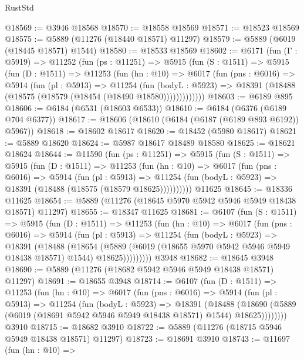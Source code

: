 \begin{lexlean}{RustStd}
\begin{coremodule}
@18569 := @3946 @18568
@18570 := @18558 @18569
@18571 := @18523 @18569
@18575 := @5889 (@11276 (@18440 @18571) @11297)
@18579 := @5889 (@6019 (@18445 @18571) @1544)
@18580 := @18533 @18569
@18602 := @6171
    (fun (Γ : @5919) =>
    @11252
      (fun (ps : @11251) =>
      @5915
        (fun (S : @1511) =>
        @5915
          (fun (D : @1511) =>
          @11253
            (fun (hn : @10) =>
            @6017
              (fun (pns : @6016) =>
              @5914
                (fun (pl : @5913) =>
                @11254
                  (fun (bodyL : @5923) =>
                  @18391 (@18488 (@18575 (@18579 (@18454 (@18490 @18580)))))))))))))
@18603 := @6189 @895
@18606 := @6184 (@6531 (@18603 @6533))
@18610 := @6184 (@6376 (@6189 @704 @6377))
@18617 := @18606 (@18610 (@6184 (@6187 (@6189 @893 @6192)) @5967))
@18618 := @18602 @18617
@18620 := @18452 (@5980 @18617)
@18621 := @5889 @18620
@18624 := @5987 @18617 @18489 @18580
@18625 := @18621 @18624
@18644 := @11590
    (fun (ps : @11251) =>
    @5915
      (fun (S : @1511) =>
      @5915
        (fun (D : @1511) =>
        @11253
          (fun (hn : @10) =>
          @6017
            (fun (pns : @6016) =>
            @5914
              (fun (pl : @5913) =>
              @11254 (fun (bodyL : @5923) => @18391 (@18488 (@18575 (@18579 @18625))))))))))
    @11625
@18645 := @18336 @11625
@18654 := @5889 (@11276 (@18645 @5970 @5942 @5946 @5949 @18438 @18571) @11297)
@18655 := @18347 @11625
@18681 := @6107
    (fun (S : @1511) =>
    @5915
      (fun (D : @1511) =>
      @11253
        (fun (hn : @10) =>
        @6017
          (fun (pns : @6016) =>
          @5914
            (fun (pl : @5913) =>
            @11254
              (fun (bodyL : @5923) =>
              @18391
                (@18488
                  (@18654
                    (@5889
                      (@6019 (@18655 @5970 @5942 @5946 @5949 @18438 @18571) @1544)
                      @18625)))))))))
    @3948
@18682 := @18645 @3948
@18690 := @5889 (@11276 (@18682 @5942 @5946 @5949 @18438 @18571) @11297)
@18691 := @18655 @3948
@18714 := @6107
    (fun (D : @1511) =>
    @11253
      (fun (hn : @10) =>
      @6017
        (fun (pns : @6016) =>
        @5914
          (fun (pl : @5913) =>
          @11254
            (fun (bodyL : @5923) =>
            @18391
              (@18488
                (@18690 (@5889 (@6019 (@18691 @5942 @5946 @5949 @18438 @18571) @1544) @18625))))))))
    @3910
@18715 := @18682 @3910
@18722 := @5889 (@11276 (@18715 @5946 @5949 @18438 @18571) @11297)
@18723 := @18691 @3910
@18743 := @11697
    (fun (hn : @10) =>

\end{coremodule}
\end{lexlean}
